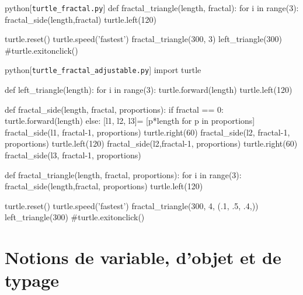 \begin{solution}[ID=4]
\begin{listing}{python}[\texttt{turtle\_fractal.py}]
def fractal_triangle(length, fractal):
    for i in range(3):
        fractal_side(length,fractal)
        turtle.left(120)

turtle.reset()
turtle.speed('fastest')
fractal_triangle(300, 3)
left_triangle(300)
#turtle.exitonclick()
\end{listing}

\begin{listing}{python}[\texttt{turtle\_fractal\_adjustable.py}]
import turtle

def left_triangle(length):
    for i in range(3):
        turtle.forward(length)
        turtle.left(120)

def fractal_side(length, fractal, proportions):
    if fractal == 0:
        turtle.forward(length)
    else:
        [l1, l2, l3]= [p*length for p in proportions]
        fractal_side(l1, fractal-1, proportions)
        turtle.right(60)
        fractal_side(l2, fractal-1, proportions)
        turtle.left(120)
        fractal_side(l2,fractal-1, proportions)
        turtle.right(60)
        fractal_side(l3, fractal-1, proportions)

def fractal_triangle(length, fractal, proportions):
    for i in range(3):
        fractal_side(length,fractal, proportions)
        turtle.left(120)

turtle.reset()
turtle.speed('fastest')
fractal_triangle(300, 4, (.1, .5, .4,))
left_triangle(300)
#turtle.exitonclick()
\end{listing}
\end{solution}

\addtocounter{code}{-3}%





\vspace{0.25\baselineskip}

\section[Variables, objets et typage]{Notions de variable, d'objet et de typage}
\label{sec:X.2}

\vspace{-0.25\baselineskip}


